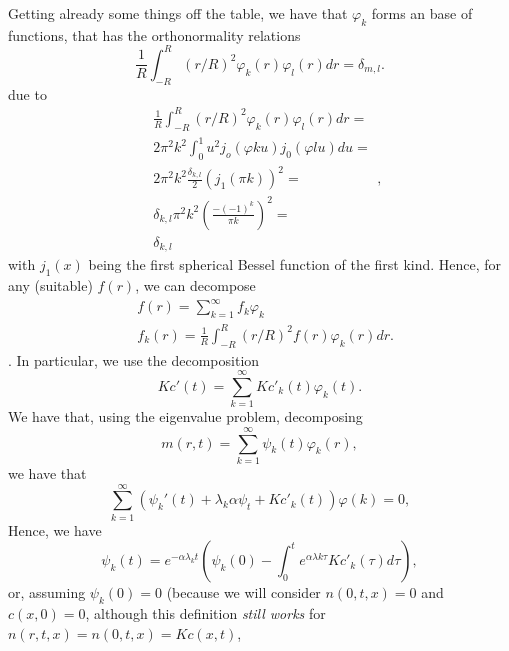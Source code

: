\documentclass[]{article}
\begin{document}
Getting already some things off the table, we have that $\varphi_k$ forms an base of functions, that has the orthonormality relations
\begin{equation}\label{orthonomalityrelations}
\frac{1}{R} \int_{-R}^R (r/R)^2 \varphi_k(r) \varphi_l(r) dr = \delta_{m,l}.
\end{equation} 
due to
\begin{equation}
\begin{split}
& \frac{1}{R} \int_{-R}^R (r/R)^2 \varphi_k(r) \varphi_l(r) dr = \\
& 2 \pi^2 k^2 \int_{0}^1 u^2 j_o(\varphi k u) j_0(\varphi l u) du = \\
& 2 \pi^2 k^2 \frac{\delta_{k,l}}{2} (j_1(\pi k))^2 = \\
& \delta_{k,l} \pi^2 k^2 \left(\frac{-(-1)^k}{\pi k}\right)^2 = \\
& \delta_{k,l}
\end{split},
\end{equation}
with $j_1(x)$ being the first spherical Bessel function of the first kind. Hence, for any (suitable) $f(r)$, we can decompose
\begin{equation}
\begin{split}
& f(r) = \sum_{k=1}^\infty f_k \varphi_k \\
& f_k(r) = \frac{1}{R} \int_{-R}^R (r/R)^2 f(r) \varphi_k(r) dr.
\end{split}
\end{equation}.
In particular, we use the decomposition
\begin{equation}
K c'(t) = \sum_{k=1}^\infty K c'_k(t) \varphi_k(t).
\end{equation}
We have that, using the eigenvalue problem, decomposing
\begin{equation}
m(r,t) = \sum_{k=1}^\infty \psi_k(t) \varphi_k(r),
\end{equation}
we have that 
\begin{equation}
\sum_{k=1}^{\infty} \left(\psi_k'(t) + \lambda_k \alpha \psi_t + K c'_k(t) \right) \varphi(k) = 0,
\end{equation}
Hence, we have
\begin{equation}\label{fullphikdefinition}
\psi_k(t) = e^{-\alpha \lambda_k t} \left(\psi_k(0) - \int_0^t e^{\alpha \lambda k \tau} K c'_k(\tau) d \tau \right),
\end{equation}
or, assuming $\psi_k(0) = 0$ (because we will consider $n(0,t,x) = 0$ and $c(x,0) = 0$, although this definition \textit{still works} for $n(r,t,x) = n(0,t,x) = K c(x,t)$, 
\end{document}
